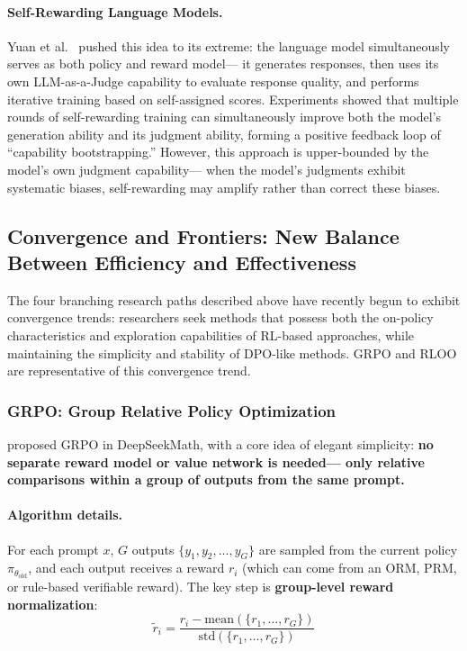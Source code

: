 \paragraph{Self-Rewarding Language Models.}
Yuan et al.\ \cite{yuan2024selfrewarding} pushed this idea to its extreme:
the language model simultaneously serves as both policy and reward model---
it generates responses, then uses its own LLM-as-a-Judge capability to evaluate response quality,
and performs iterative training based on self-assigned scores.
Experiments showed that multiple rounds of self-rewarding training can simultaneously improve
both the model's generation ability and its judgment ability,
forming a positive feedback loop of ``capability bootstrapping.''
However, this approach is upper-bounded by the model's own judgment capability---
when the model's judgments exhibit systematic biases, self-rewarding may amplify rather than correct these biases.

\subsection{Convergence and Frontiers: New Balance Between Efficiency and Effectiveness}
\label{sec:t2-convergence}

The four branching research paths described above have recently begun to exhibit convergence trends:
researchers seek methods
that possess both the on-policy characteristics and exploration capabilities of RL-based approaches,
while maintaining the simplicity and stability of DPO-like methods.
GRPO and RLOO are representative of this convergence trend.

\subsubsection{GRPO: Group Relative Policy Optimization}
\label{sec:t2-grpo}

 proposed GRPO in DeepSeekMath,
with a core idea of elegant simplicity:
\textbf{no separate reward model or value network is needed---
only relative comparisons within a group of outputs from the same prompt.}

\paragraph{Algorithm details.}
For each prompt $x$, $G$ outputs $\{y_1, y_2, \ldots, y_G\}$ are sampled from the current policy $\pi_{\theta_{\text{old}}}$,
and each output receives a reward $r_i$ (which can come from an ORM, PRM, or rule-based verifiable reward).
The key step is \textbf{group-level reward normalization}:
\begin{equation}
\label{eq:pref:grpo-advantage}
\tilde{r}_i = \frac{r_i - \text{mean}(\{r_1, \ldots, r_G\})}{\text{std}(\{r_1, \ldots, r_G\})}
\end{equation}

